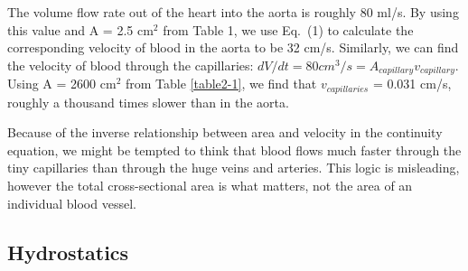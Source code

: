 The volume flow rate out of the heart into the aorta is roughly 80 ml/s.  By using this value and A = 2.5 cm$^2$ from Table 1, we use Eq.~(1) to calculate the corresponding velocity of blood in the aorta to be 32 cm/s.  Similarly, we can find the velocity of blood through the capillaries:  $dV/dt = 80 cm^3/s = A_{capillary}v_{capillary}$.  Using A = 2600 cm$^2$ from Table \ref{table2-1}, we find that $v_{capillaries}$ = 0.031 cm/s, roughly a thousand times slower than in the aorta.

Because of the inverse relationship between area and velocity in the continuity equation, we might be tempted to think that blood flows much faster through the tiny capillaries than through the huge veins and arteries.  This logic is misleading, however the total cross-sectional area is what matters, not the area of an individual blood vessel.

\subsection{Hydrostatics}
 
